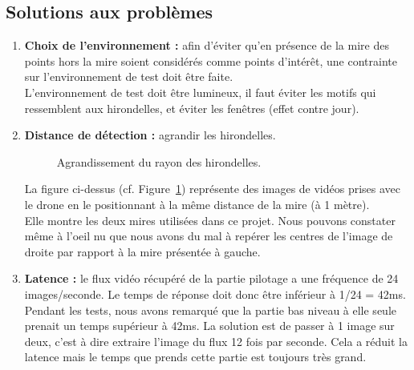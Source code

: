 \documentclass[12pt]{article}
\begin{document}
\subsection{Solutions aux problèmes }
\begin{enumerate}
\item \textbf{Choix de l'environnement :  } afin d'éviter qu'en présence de la mire des points hors la mire soient considérés comme points d'intérêt, une contrainte sur l'environnement de test doit être faite.\\ 
L'environnement de test doit être lumineux, il faut éviter les motifs qui ressemblent aux hirondelles, et éviter les fenêtres (effet contre jour).

\item \textbf{Distance de détection : } 
agrandir les hirondelles.
\begin{figure}[H]
    \centering
    \qquad
    \caption{Agrandissement du rayon des hirondelles.}
    \label{fig:rayon_mire}
\end{figure}

La figure ci-dessus (cf. Figure~\ref{fig:rayon_mire}) représente des images de vidéos prises avec le drone en le positionnant à la même distance de la mire (à 1 mètre).\\
Elle montre les deux mires utilisées dans ce projet. Nous pouvons constater même à l'oeil nu que nous avons du mal à repérer les centres de l'image de droite par rapport à la mire présentée à gauche.
\item \textbf{Latence : } 
le flux vidéo récupéré de la partie pilotage a une fréquence de 24 images/seconde. Le temps de réponse doit donc être inférieur à 1/24 = 42ms.\\
Pendant les tests, nous avons remarqué que la partie bas niveau à elle seule prenait un temps supérieur à 42ms.
La solution est de passer à 1 image sur deux, c'est à dire extraire l'image du flux 12 fois par seconde. Cela a réduit la latence mais le temps que prends cette partie est toujours très grand.


\end{enumerate}
\end{document}
